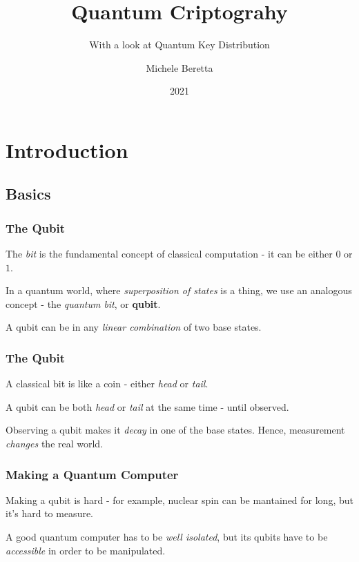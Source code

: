 \documentclass{beamer}
\title{Quantum Criptograhy}
\subtitle{With a look at Quantum Key Distribution}
\author{Michele Beretta}
\institute{UniBG
  \\ \url{https://github.com/micheleberetta98/qkd-presentation}
}
\date{2021}
\begin{document}
  \begin{frame}[plain]
    \titlepage
  \end{frame}


  \section{Introduction}
  \subsection{Basics}
  \begin{frame}
    \frametitle{The Qubit}
    The \textit{bit} is the fundamental concept of classical computation - it can be either $0$ or $1$.

    In a quantum world, where \textit{superposition of states} is a thing, we use an analogous concept -
    the \textit{quantum bit}, or \textbf{qubit}.

    A qubit can be in any \textit{linear combination} of two base states.
  \end{frame}
  \begin{frame}
    \frametitle{The Qubit}
    A classical bit is like a coin - either \textit{head} or \textit{tail}.

    A qubit can be both \textit{head} or \textit{tail} at the same time - until observed.

    Observing a qubit makes it \textit{decay} in one of the base states. Hence, measurement
    \textit{changes} the real world.
  \end{frame}
  \begin{frame}
    \frametitle{Making a Quantum Computer}
    Making a qubit is hard - for example, nuclear spin can be mantained for long, but it's hard to measure.

    A good quantum computer has to be \textit{well isolated}, but its qubits have to be \textit{accessible}
    in order to be manipulated.
  \end{frame}
  
\end{document}
